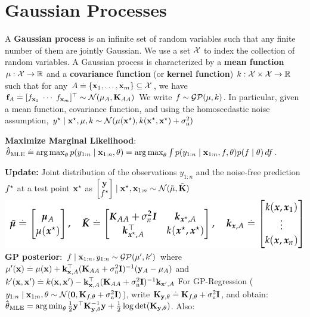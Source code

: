 \section{Gaussian Processes}
\begin{framed}
    A \textbf{Gaussian process} is an infinite set of random variables such that any finite number of them are jointly Gaussian. We use a set $\mathcal{X}$ to index the collection of random variables.
    A Gaussian process is characterized by a \textbf{mean function} $\mu : \mathcal{X} \to \mathbb{R}$ and a \textbf{covariance function} (or \textbf{kernel function}) $k : \mathcal{X} \times \mathcal{X} \to \mathbb{R}$ such that for any $A \overset{.}{=} \{\mathbf{x}_1, \dots, \mathbf{x}_m\} \subseteq \mathcal{X}$, we have 
  $\vf_\sA \defeq \transpose{[f_{\vx_1} \; \cdots \; f_{\vx_m}]} \sim \N{\vmu_\sA}{\mK_{\sA\sA}}$ 
We write $f \sim \GP{\mu}{k}$.
In particular, given a mean function, covariance function, and using the homoscedastic noise assumption, 
  $\ys \mid \vxs, \mu, k \sim \N{\mu(\vxs)}{k(\vxs, \vxs) + \sigman^2}$
\end{framed}
\begin{framed}
    \textbf{Maximize Marginal Likelihood}: \\
    $ \mathbf{\hat{\theta}}_{\mathrm{MLE}} \overset{.}{=} \operatorname*{arg\,max}_{\mathbf{\theta}} p(y_{1:n} \mid \mathbf{x}_{1:n}, \mathbf{\theta}) \\= \operatorname*{arg\,max}_{\mathbf{\theta}} \int p(y_{1:n} \mid \mathbf{x}_{1:n}, f, \mathbf{\theta}) p(f \mid \mathbf{\theta}) \,d f$.
\end{framed}
\textbf{Update:} Joint distribution of the observations $y_{1:n}$ and the noise-free prediction $f^\star$ at a test point $\mathbf{x^\star}$ as $\begin{bmatrix}
    \vy \\
    \fs \\
  \end{bmatrix} \mid \vxs, \vx_{1:n} \sim \N{\Tilde{\vmu}}{\Tilde{\mK}}$ \\
\includegraphics[width=\linewidth]{images/GP_Update}
\textbf{GP posterior}: 
$f \mid \vx_{1:n}, y_{1:n} \sim \GP{\mu'}{k'}$ where $
  \mu'(\mathbf{x}) \overset{.}{=} \mu(\mathbf{x}) + \mathbf{k}_{\mathbf{x},A}^\top (\mathbf{K}_{AA} + \sigma_{\mathrm{n}}^2 \mathbf{I})^{-1} (\mathbf{y}_A - \mathbf{\mu}_A)$ and $
  k'(\mathbf{x}, \mathbf{x'}) \overset{.}{=} k(\mathbf{x}, \mathbf{x'}) - \mathbf{k}_{\mathbf{x},A}^\top (\mathbf{K}_{AA} + \sigma_{\mathrm{n}}^2 \mathbf{I})^{-1} \mathbf{k}_{\mathbf{x'},A}$
For GP-Regression ($y_{1:n} \mid \vx_{1:n}, \vtheta \sim \N{\vzero}{\mK_{f,\vtheta} + \sigman^2 \mI}$), write $\mathbf{K}_{\mathbf{y},\mathbf{\theta}} \overset{.}{=} \mathbf{K}_{f,\mathbf{\theta}} + \sigma_{\mathrm{n}}^2 \mathbf{I}$, and obtain: $\vthetahat_\MLE = \argmin_{\vtheta} \frac{1}{2} \transpose{\vy} \inv{\mK_{\vy,\vtheta}} \vy + \frac{1}{2} \log \det{\mK_{\vy,\vtheta}}$. Also:
